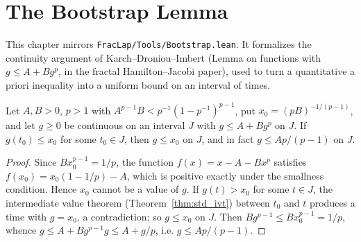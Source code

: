 \chapter{The Bootstrap Lemma}

This chapter mirrors \texttt{FracLap/Tools/Bootstrap.lean}. It formalizes the continuity argument of Karch--Droniou--Imbert (Lemma on functions with $g \le A + B g^p$, in the fractal Hamilton--Jacobi paper), used to turn a quantitative a priori inequality into a uniform bound on an interval of times.

\begin{theorem}\label{thm:bootstrap}
\leanok
Let $A, B > 0$, $p > 1$ with $A^{p-1} B < p^{-1} (1 - p^{-1})^{p-1}$, put $x_0 = (pB)^{-1/(p-1)}$, and let $g \ge 0$ be continuous on an interval $J$ with $g \le A + B g^p$ on $J$. If $g(t_0) \le x_0$ for some $t_0 \in J$, then $g \le x_0$ on $J$, and in fact $g \le A p / (p - 1)$ on $J$.
\end{theorem}

\begin{proof}
\leanok
Since $B x_0^{p-1} = 1/p$, the function $f(x) = x - A - B x^p$ satisfies $f(x_0) = x_0 (1 - 1/p) - A$, which is positive exactly under the smallness condition. Hence $x_0$ cannot be a value of $g$. If $g(t) > x_0$ for some $t \in J$, the intermediate value theorem (Theorem~\ref{thm:std_ivt}) between $t_0$ and $t$ produces a time with $g = x_0$, a contradiction; so $g \le x_0$ on $J$. Then $B g^{p-1} \le B x_0^{p-1} = 1/p$, whence $g \le A + B g^{p-1} g \le A + g/p$, i.e. $g \le A p / (p - 1)$.
\end{proof}
